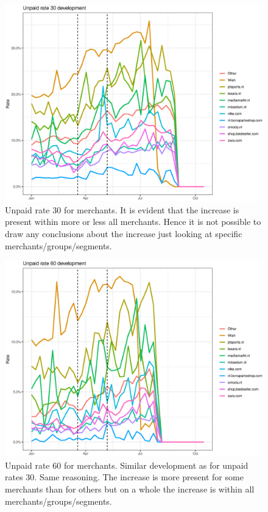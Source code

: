 
\begin{figure}[!ht]
  \centering
  \includegraphics[width=5in,trim={0 0 0 0},clip]{content/figures/rate30_dev_nl_mer.eps} 
  \caption{Unpaid rate 30 for merchants. It is evident that the increase is present within more or less all merchants. Hence it is not possible to draw any conclusions about the increase just looking at specific merchants/groups/segments.}
  \label{fig:rate30_dev_mer}
\end{figure}

\begin{figure}[!ht]
  \centering
  \includegraphics[width=5in,trim={0 0 0 0},clip]{content/figures/rate60_dev_nl_mer.eps} 
  \caption{Unpaid rate 60 for merchants. Similar development as for unpaid rates 30. Same reasoning. The increase is more present for some merchants than for others but on a whole the increase is within all merchants/groups/segments.}
  \label{fig:rate60_dev_mer}
\end{figure}

